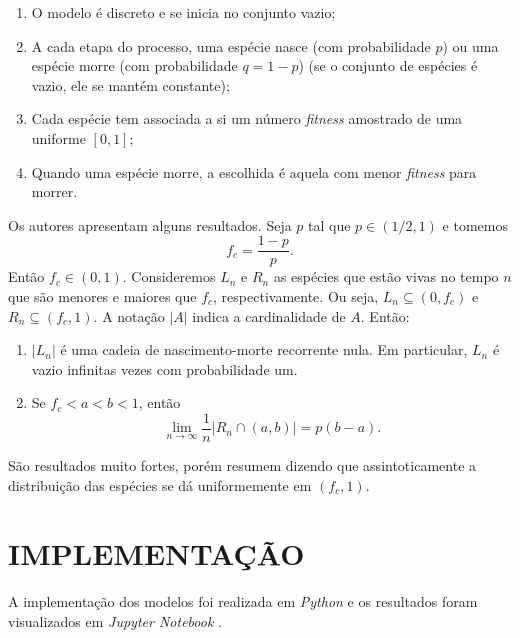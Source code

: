\documentclass[10pt,brazil,english]{article}
\begin{document}
        \renewcommand{\theenumi}{\roman{enumi}} 
        \begin{enumerate}
            \item O modelo é discreto e se inicia no conjunto vazio;
            \item A cada etapa do processo, uma espécie nasce (com probabilidade $p$) ou uma espécie morre (com probabilidade $q = 1 - p$) (se o conjunto de espécies é vazio, ele se mantém constante);
            \item Cada espécie tem associada a si um número \textit{fitness} amostrado de uma uniforme $[0, 1]$;
            \item Quando uma espécie morre, a escolhida é aquela com menor \textit{fitness} para morrer.
        \end{enumerate}

        Os autores apresentam alguns resultados. Seja $p$ tal que $p \in (1/2, 1)$ e tomemos $$f_c = \frac{1 - p}{p}\textrm{.}$$
        Então $f_c \in (0, 1)$.
        Consideremos $L_n$ e $R_n$ as espécies que estão vivas no tempo $n$ que são menores e maiores que $f_c$, respectivamente. Ou seja, $L_n \subseteq (0, f_c)$ e $R_n \subseteq (f_c, 1)$. A notação $|A|$ indica a cardinalidade de $A$. Então:

        \begin{theorem} \cite{guiol2009stochastic}
            \label{theorem1}
            \renewcommand{\theenumi}{\alph{enumi}} 
            \begin{enumerate}
                \item $|L_n|$ é uma cadeia de nascimento-morte recorrente nula. Em particular, $L_n$ é vazio infinitas vezes com probabilidade um.
                \item Se $f_c < a < b < 1$, então $$\lim_{n \to \infty} \dfrac{1}{n} |R_n \cap (a, b)| = p(b - a) \textrm{.}$$
            \end{enumerate}
        \end{theorem}

        São resultados muito fortes, porém  resumem dizendo que assintoticamente a distribuição das espécies se dá uniformemente em $(f_c, 1)$.

    \section{IMPLEMENTAÇÃO}

        A implementação dos modelos foi realizada em \textit{Python} e os resultados foram visualizados em \textit{Jupyter Notebook} \cite{domingues2019github}.
\end{document}
